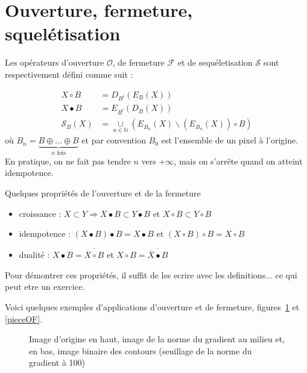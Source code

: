 \documentclass[10pt,a4paper]{article}
\begin{document}
\clearpage
\section{Ouverture, fermeture, squel\'{e}tisation}

Les op\'{e}rateurs d'ouverture $\mathcal{O}$, de fermeture $\mathcal{F}$ et de sequ\'{e}letisation $\mathcal{S}$ sont respectivement d\'{e}fini comme suit : 

\begin{align*}	
	X\circ B &=  D_{B^t}\left(E_{B}\left(X\right)\right) \\
	X\bullet B &= E_{B^t}\left(D_{B}\left(X\right)\right) \\
	\mathcal{S}_{B}\left(X\right) &= \underset{n\in \mathbb{N}}{\cup} \left(E_{B_n}\left(X\right) \backslash \left(E_{B_n}\left(X\right)\right)\circ B \right)
\end{align*}
o\`{u} $B_n =\underset{n \text{ fois}}{\underbrace{B\oplus\ldots\oplus B}}$ et par convention $B_0$ est l'ensemble de un pixel \`{a} l'origine. En pratique, on ne fait pas tendre $n$ vers $+\infty$, mais on s'arr\^{e}te quand on atteint idempotence.

Quelques propri\'{e}t\'{e}s de l'ouverture et de la fermeture
\begin{itemize}
	\item croissance : $X\subset Y \Rightarrow X\bullet B \subset Y\bullet B \text{ et } X\circ B \subset Y\circ B$
	\item idempotence : $\left( X\bullet B \right) \bullet B = X\bullet B $ et $\left( X \circ B \right) \circ B = X\circ B $
	\item dualit\'{e} : $ X\bullet B = \overline{ \overline{X}\circ B}$ et $ X\circ B = \overline{ \overline{X}\bullet B}$
\end{itemize}

Pour d\'{e}montrer ces propri\'{e}t\'{e}s, il suffit de les ecrire avec les definitions... ce qui peut etre un exercice.

Voici quelques exemples d'applications d'ouverture et de fermeture, figures~\ref{piece} et \ref{pieceOF}.


\begin{figure}[h]
\hspace{-0.2\textwidth}
	\caption{Image d'origine en haut, image de la norme du gradient au milieu et, en bas, image binaire des contours (seuillage de la norme du gradient \`{a} 100)}
	\label{piece}
\end{figure}
\end{document}

